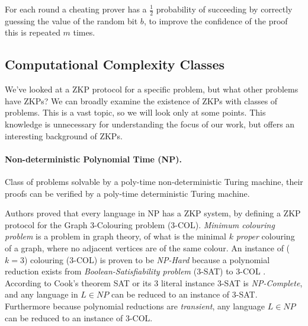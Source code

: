 \noindent For each round a cheating prover has a $\frac{1}{2}$ probability of succeeding by correctly guessing the value of the random bit $b$, to improve the confidence of the proof this is repeated $m$ times.


\subsection{Computational Complexity Classes}
We've looked at a ZKP protocol for a specific problem, but what other problems have ZKPs?
We can broadly examine the existence of ZKPs with classes of problems. This is a vast topic, so we will look only at some points. 
This knowledge is unnecessary for understanding the focus of our work, but offers an interesting background of ZKPs.

\paragraph{Non-deterministic Polynomial Time (NP).}
Class of problems solvable by a poly-time non-deterministic Turing machine, their proofs can be verified by a poly-time deterministic Turing machine.

Authors \cite{GMW} proved that every language in NP has a ZKP system, by defining a ZKP protocol for the Graph 3-Colouring problem (3-COL).
\textit{Minimum colouring problem} is a problem in graph theory, of what is the minimal $k$ \textit{proper} colouring of a graph, where no adjacent vertices are of the same colour.
An instance of ($k=3$) colouring (3-COL) is proven to be \textit{NP-Hard} because a polynomial reduction exists from \textit{Boolean-Satisfiability problem} (3-SAT) to 3-COL \cite{moore2011nature}.
According to Cook's theorem \cite{cook1971complexity} SAT or its 3 literal instance 3-SAT is \textit{NP-Complete}, and any language in $L \in NP$ can be reduced to an instance of 3-SAT. 
Furthermore because polynomial reductions are \textit{transient}, any language $L \in NP$ can be reduced to an instance of 3-COL.